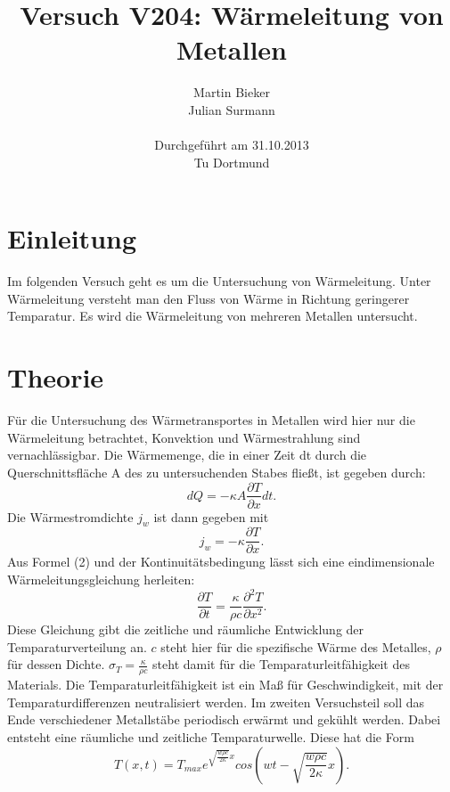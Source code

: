 \documentclass[11pt]{article}
\title{\textbf{Versuch V204: Wärmeleitung von Metallen}}
\author{Martin Bieker\\
		Julian Surmann\\
		\\
		Durchgef\"{u}hrt am 31.10.2013\\
		Tu Dortmund}
\date{}
\begin{document}
\renewcommand\tablename{Tabelle}
\renewcommand\figurename{Abbildung}
\maketitle
\thispagestyle{empty}
\newpage
\clearpage
\setcounter{page}{1}


\section{Einleitung}
Im folgenden Versuch geht es um die Untersuchung von Wärmeleitung. Unter Wärmeleitung versteht man den Fluss von Wärme in Richtung geringerer Temparatur. Es wird die Wärmeleitung von mehreren Metallen untersucht. 
\section{Theorie}
Für die Untersuchung des Wärmetransportes in Metallen wird hier nur die Wärmeleitung betrachtet, Konvektion und Wärmestrahlung sind vernachlässigbar.
Die Wärmemenge, die in einer Zeit dt durch die Querschnittsfläche A des zu untersuchenden Stabes fließt, ist gegeben durch:
\begin{equation}
dQ = -\kappa A \frac{\partial T}{\partial x} dt.
\end{equation}
Die Wärmestromdichte $j_w$ ist dann gegeben mit
\begin{equation}
j_w = -\kappa \frac{\partial T}{\partial x}.
\end{equation}
Aus Formel (2) und der Kontinuitätsbedingung lässt sich eine eindimensionale Wärmeleitungsgleichung herleiten:
\begin{equation}
\frac{\partial T}{\partial t} = \frac{\kappa}{\rho c} \frac{\partial^2 T}{\partial x^2}.
\end{equation}
Diese Gleichung gibt die zeitliche und räumliche Entwicklung der Temparaturverteilung an. $c$ steht hier für die spezifische Wärme des Metalles, $\rho$ für dessen Dichte.
$\sigma_T = \frac{\kappa}{\rho c}$ steht damit für die Temparaturleitfähigkeit des Materials. Die Temparaturleitfähigkeit ist ein Maß für Geschwindigkeit, mit der Temparaturdifferenzen neutralisiert werden.
Im zweiten Versuchsteil soll das Ende verschiedener Metallstäbe periodisch erwärmt und gekühlt werden. Dabei entsteht eine räumliche und zeitliche Temparaturwelle. Diese hat die Form
\begin{equation}
T(x,t) = T_{max} e^{\sqrt{\frac{w \rho c}{2 \kappa}}x}cos \left( wt- \sqrt{\frac{w \rho c}{2 \kappa}}x \right).
\end{equation}
\end{document}
